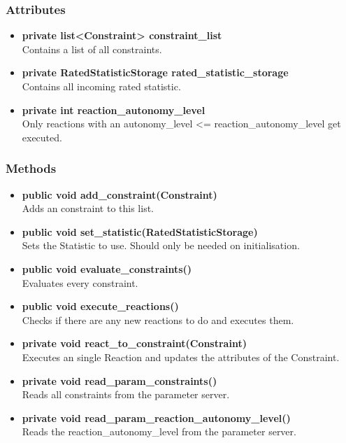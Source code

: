 \subsubsection{Attributes}
\begin{itemize}
	\item \textbf{ private list<Constraint> constraint\_list }\\
		Contains a list of all constraints.
	\item \textbf{ private  RatedStatisticStorage rated\_statistic\_storage }\\
		Contains all incoming rated statistic.
	\item \textbf{ private  int reaction\_autonomy\_level }\\
		Only reactions with an autonomy\_level <= reaction\_autonomy\_level get executed.
\end{itemize}
\subsubsection{Methods}
\begin{itemize}
	\item \textbf{ public void add\_constraint(Constraint)  }\\
		Adds an constraint to this list.
	\item \textbf{ public void set\_statistic(RatedStatisticStorage)  }\\
		Sets the Statistic to use. Should only be needed on initialisation.
	\item \textbf{ public void evaluate\_constraints()  }\\
		Evaluates every constraint.
	\item \textbf{ public void execute\_reactions()  }\\
		Checks if there are any new reactions to do and executes them.
	\item \textbf{ private void react\_to\_constraint(Constraint)  }\\
		Executes an single Reaction and updates the attributes of the Constraint.
	\item \textbf{ private void read\_param\_constraints()  }\\
		Reads all constraints from the parameter server.
	\item \textbf{ private void read\_param\_reaction\_autonomy\_level()  }\\
		Reads the reaction\_autonomy\_level from the parameter server.
\end{itemize}

